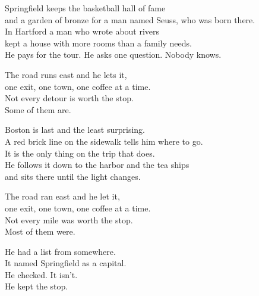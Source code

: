 \begin{lyrics}
Springfield keeps the basketball hall of fame\\
and a garden of bronze for a man named Seuss, who was born there.\\
In Hartford a man who wrote about rivers\\
kept a house with more rooms than a family needs.\\
He pays for the tour. He asks one question. Nobody knows.

The road runs east and he lets it,\\
one exit, one town, one coffee at a time.\\
Not every detour is worth the stop.\\
Some of them are.

Boston is last and the least surprising.\\
A red brick line on the sidewalk tells him where to go.\\
It is the only thing on the trip that does.\\
He follows it down to the harbor and the tea ships\\
and sits there until the light changes.

The road ran east and he let it,\\
one exit, one town, one coffee at a time.\\
Not every mile was worth the stop.\\
Most of them were.

He had a list from somewhere.\\
It named Springfield as a capital.\\
He checked. It isn't.\\
He kept the stop.
\end{lyrics}

